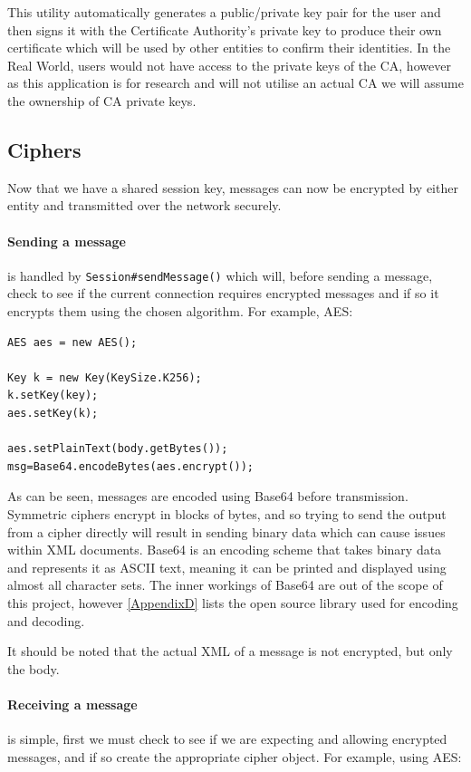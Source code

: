   This utility automatically generates a public/private key pair for the user and then signs it with the Certificate Authority's private key to produce their own certificate which will be used by other entities to confirm their identities. In the Real World, users would not have access to the private keys of the CA, however as this application is for research and will not utilise an actual CA we will assume the ownership of CA private keys.
  
  \subsection{Ciphers}
  
  Now that we have a shared session key, messages can now be encrypted by either entity and transmitted over the network securely. 
  
  \paragraph{Sending a message} is handled by \verb!Session#sendMessage()! which will, before sending a message, check to see if the current connection requires encrypted messages and if so it encrypts them using the chosen algorithm. For example, AES: \\
  
  \begin{lstlisting}
AES aes = new AES();
				
Key k = new Key(KeySize.K256);
k.setKey(key);
aes.setKey(k);
			
aes.setPlainText(body.getBytes());
msg=Base64.encodeBytes(aes.encrypt());
\end{lstlisting}

  As can be seen, messages are encoded using Base64 before transmission. Symmetric ciphers encrypt in blocks of bytes, and so trying to send the output from a cipher directly will result in sending binary data which can cause issues within XML documents. Base64 is an encoding scheme that takes binary data and represents it as ASCII text, meaning it can be printed and displayed using almost all character sets. The inner workings of Base64 are out of the scope of this project, however \textsection\ref{AppendixD} lists the open source library used for encoding and decoding.
  
  It should be noted that the actual XML of a message is not encrypted, but only the body.
  
  \paragraph{Receiving a message} is simple, first we must check to see if we are expecting and allowing encrypted messages, and if so create the appropriate cipher object. For example, using AES: \\
  
